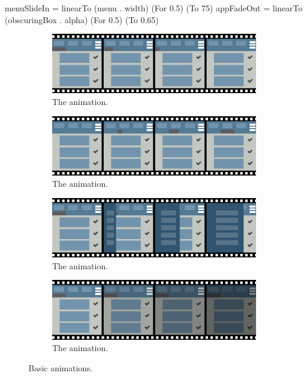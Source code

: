 \begin{spec}
menuSlideIn = linearTo (menu . width) (For 0.5) (To 75)
appFadeOut = linearTo (obscuringBox . alpha) (For 0.5) (To 0.65)
\end{spec}

\begin{figure}[!htbp]
\centering

\begin{subfigure}[h]{\textwidth}
\centering
\includegraphics[width=\figscale\textwidth]{pictures/line1OutroFig}
\caption{The  animation.}
\label{fig:basic1_1}
\end{subfigure}

\begin{subfigure}[h]{\textwidth}
\centering
\includegraphics[width=\figscale\textwidth]{pictures/line2IntroFig}
\caption{The  animation.}
\label{fig:basic1_2}
\end{subfigure}

\begin{subfigure}[h]{\textwidth}
\centering
\includegraphics[width=\figscale\textwidth]{pictures/menuSlideInFig}
\caption{The  animation.}
\label{fig:basic2_1}
\end{subfigure}

\begin{subfigure}[h]{\textwidth}
\centering
\includegraphics[width=\figscale\textwidth]{pictures/appFadeOutFig}
\caption{The  animation.}
\label{fig:basic2_2}
\end{subfigure}

\caption{Basic  animations.}
\label{fig:basic}
\end{figure}

